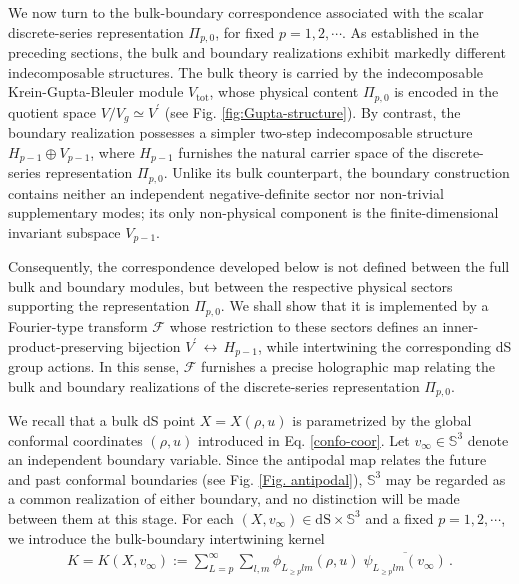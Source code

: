 \documentclass[aps,twocolumn,nofootinbib]{revtex4}
\begin{document}
{We now turn to the bulk-boundary correspondence associated with the scalar discrete-series representation $\Pi_{p,0}$, for fixed $p=1,2,\cdots$. As established in the preceding sections, the bulk and boundary realizations exhibit markedly different indecomposable structures. The bulk theory is carried by the indecomposable Krein-Gupta-Bleuler module $V_{\mathrm{tot}}$, whose physical content $\Pi_{p,0}$ is encoded in the quotient space $V/V_g \simeq V^\prime$ (see Fig. \ref{fig:Gupta-structure}). By contrast, the boundary realization possesses a simpler two-step indecomposable structure $H_{p-1}\oplus V_{p-1}$, where $H_{p-1}$ furnishes the natural carrier space of the discrete-series representation $\Pi_{p,0}$. Unlike its bulk counterpart, the boundary construction contains neither an independent negative-definite sector nor non-trivial supplementary modes; its only non-physical component is the finite-dimensional invariant subspace $V_{p-1}$.

Consequently, the correspondence developed below is not defined between the full bulk and boundary modules, but between the respective physical sectors supporting the representation $\Pi_{p,0}$. We shall show that it is implemented by a Fourier-type transform $\mathcal{F}$ whose restriction to these sectors defines an inner-product-preserving bijection $V^\prime \,\longleftrightarrow\, H_{p-1}$, while intertwining the corresponding dS group actions. In this sense, $\mathcal{F}$ furnishes a precise holographic map relating the bulk and boundary realizations of the discrete-series representation $\Pi_{p,0}$.

We recall that a bulk dS point $X=X(\rho,u)$ is parametrized by the global conformal coordinates $(\rho,u)$ introduced in Eq. \eqref{confo-coor}. Let $v_\infty\in{{\mathbb{S}}}^3$ denote an independent boundary variable. Since the antipodal map relates the future and past conformal boundaries (see Fig. \ref{Fig. antipodal}), ${{\mathbb{S}}}^3$ may be regarded as a common realization of either boundary, and no distinction will be made between them at this stage. For each $(X,v_\infty)\in \mathrm{dS}\times{{\mathbb{S}}}^3$ and a fixed $p=1,2,\cdots$, we introduce the bulk-boundary intertwining kernel
\begin{align}\label{eq:K-ds-corrected}
    K=K(X,v_{\infty}) := \sum_{L=p}^{\infty}\sum_{l,m} \phi^{}_{L^{}_{\geqslant p}lm}(\rho,u)\; \overline{\psi^{}_{L^{}_{\geqslant p}lm} (v_{\infty})} \,.
\end{align}

}
\end{document}
